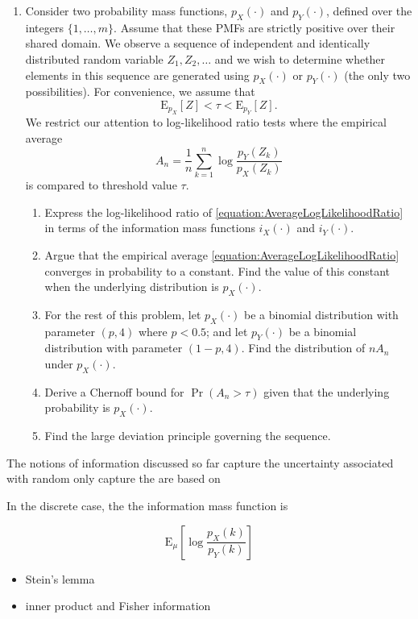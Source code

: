 \begin{enumerate}
\item Consider two probability mass functions, $p_X (\cdot)$ and $p_Y (\cdot)$, defined over the integers $\{ 1, \ldots, m \}$.
Assume that these PMFs are strictly positive over their shared domain.
We observe a sequence of independent and identically distributed random variable $Z_1, Z_2, \ldots$ and we wish to determine whether elements in this sequence are generated using $p_X (\cdot)$ or $p_Y (\cdot)$ (the only two possibilities).
For convenience, we assume that
\begin{equation*}
\mathrm{E}_{p_X} [Z] < \tau < \mathrm{E}_{p_Y} [Z] .
\end{equation*}
We restrict our attention to log-likelihood ratio tests where the empirical average
\begin{equation} \label{equation:AverageLogLikelihoodRatio}
A_n = \frac{1}{n} \sum_{k=1}^n \log \frac{p_Y (Z_k)}{p_X (Z_k)} 
\end{equation}
is compared to threshold value $\tau$.

\begin{enumerate}
\item Express the log-likelihood ratio of \eqref{equation:AverageLogLikelihoodRatio} in terms of the information mass functions $i_X (\cdot)$ and $i_Y (\cdot)$.
\item Argue that the empirical average \eqref{equation:AverageLogLikelihoodRatio} converges in probability to a constant.
Find the value of this constant when the underlying distribution is $p_X(\cdot)$.
\item For the rest of this problem, let $p_X (\cdot)$ be a binomial distribution with parameter $(p, 4)$ where $p < 0.5$; and let $p_Y(\cdot)$ be a binomial distribution with parameter $(1-p, 4)$.
Find the distribution of $n A_n$ under $p_X (\cdot)$.
\item Derive a Chernoff bound for $\Pr (A_n > \tau)$ given that the underlying probability is $p_X (\cdot)$.
\item Find the large deviation principle governing the sequence.
\end{enumerate}

\end{enumerate}


The notions of information discussed so far capture the uncertainty associated with random
only capture the are based on 

In the discrete case, the the information mass function is 


\begin{equation*}
\mathrm{E}_{\mu} \left[ \log \frac{p_X(k)}{p_Y(k)} \right]
\end{equation*}

\begin{itemize}
\item Stein's lemma
\item inner product and Fisher information
\end{itemize}
